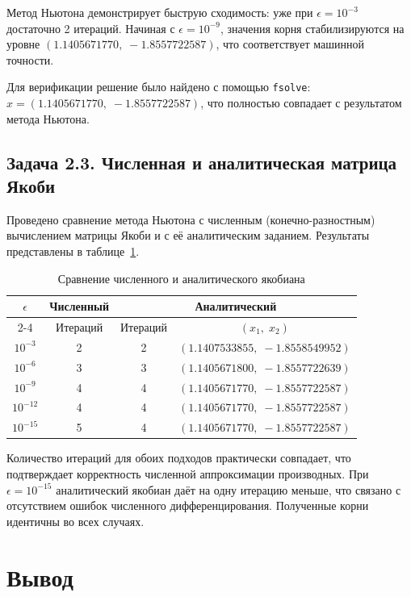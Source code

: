 \documentclass[a4paper]{article}
\begin{document}
Метод Ньютона демонстрирует быструю сходимость: уже при $\epsilon = 10^{-3}$ достаточно 2 итераций. Начиная с $\epsilon = 10^{-9}$, значения корня стабилизируются на уровне $(1.1405671770,\;-1.8557722587)$, что соответствует машинной точности.

Для верификации решение было найдено с помощью \texttt{fsolve}: $x = (1.1405671770,\;-1.8557722587)$, что полностью совпадает с результатом метода Ньютона.

\subsection*{Задача 2.3. Численная и аналитическая матрица Якоби}

Проведено сравнение метода Ньютона с численным (конечно-разностным) вычислением матрицы Якоби и с её аналитическим заданием. Результаты представлены в таблице~\ref{tab:task2_3}.

\begin{table}[H]
\centering
\caption{Сравнение численного и аналитического якобиана}
\label{tab:task2_3}
\begin{tabular}{|c|c|c|c|}
\hline
\multirow{2}{*}{$\epsilon$} & Численный & \multicolumn{2}{c|}{Аналитический} \\
\cline{2-4}
& Итераций & Итераций & $(x_1,\;x_2)$ \\
\hline
$10^{-3}$  & 2 & 2 & $(1.1407533855,\;-1.8558549952)$ \\
$10^{-6}$  & 3 & 3 & $(1.1405671800,\;-1.8557722639)$ \\
$10^{-9}$  & 4 & 4 & $(1.1405671770,\;-1.8557722587)$ \\
$10^{-12}$ & 4 & 4 & $(1.1405671770,\;-1.8557722587)$ \\
$10^{-15}$ & 5 & 4 & $(1.1405671770,\;-1.8557722587)$ \\
\hline
\end{tabular}
\end{table}

Количество итераций для обоих подходов практически совпадает, что подтверждает корректность численной аппроксимации производных. При $\epsilon = 10^{-15}$ аналитический якобиан даёт на одну итерацию меньше, что связано с отсутствием ошибок численного дифференцирования. Полученные корни идентичны во всех случаях.

\newpage

\section*{\centering\fontsize{14pt}{0pt}\selectfont\textbf{Вывод}\label{sec:conclusion}}
\end{document}
